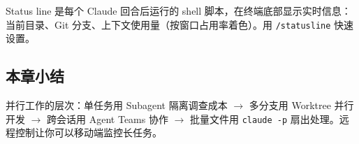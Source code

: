 Status line 是每个 Claude 回合后运行的 shell 脚本，在终端底部显示实时信息：当前目录、Git 分支、上下文使用量（按窗口占用率着色）。用 \texttt{/statusline} 快速设置。

\subsection{本章小结}

并行工作的层次：单任务用 Subagent 隔离调查成本 $\to$ 多分支用 Worktree 并行开发 $\to$ 跨会话用 Agent Teams 协作 $\to$ 批量文件用 \texttt{claude -p} 扇出处理。远程控制让你可以移动端监控长任务。

